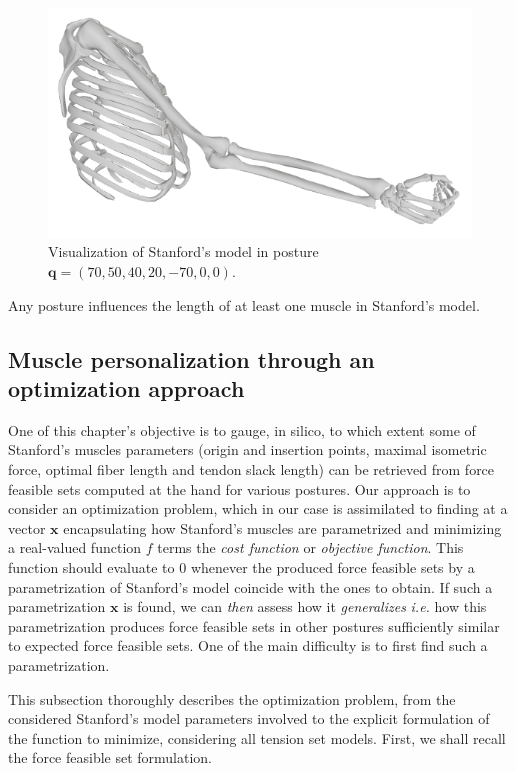 \begin{figure}[!htb]
\begin{minipage}{0.3\linewidth}
        \centering
        \includegraphics[trim={0 0 0 0}, clip, width=0.9\linewidth]{img/chapter_4/stanford_sagittal_pose1.png}
    \end{minipage}
    \caption{Visualization of Stanford's model in posture $\mathbf{q} = (70, 50, 40, 20, -70, 0, 0)$.}
    \label{fig:stanford_pose_1}
\end{figure}

Any posture influences the length of at least one muscle in Stanford's model.

\subsection{Muscle personalization through an optimization approach}
\label{subsec:optimization_pb}
One of this chapter's objective is to gauge, in silico, to which extent some of Stanford's muscles parameters (origin and insertion points, maximal isometric force, optimal fiber length and tendon slack length) can be retrieved from force feasible sets computed at the hand for various postures. Our approach is to consider an optimization problem, which in our case is assimilated to finding at a vector $\mathbf{x}$ encapsulating how Stanford's muscles are parametrized and minimizing a real-valued function $f$ terms the \emph{cost function} or \emph{objective function}. This function should evaluate to $0$ whenever the produced force feasible sets by a parametrization of Stanford's model coincide with the ones to obtain. If such a parametrization $\mathbf{x}$ is found, we can \emph{then} assess how it \emph{generalizes} \emph{i.e.} how this parametrization produces force feasible sets in other postures sufficiently similar to expected force feasible sets. One of the main difficulty is to first find such a parametrization. 

This subsection thoroughly describes the optimization problem, from the considered Stanford's model parameters involved to the explicit formulation of the function to minimize, considering all tension set models. First, we shall recall the force feasible set formulation.  

